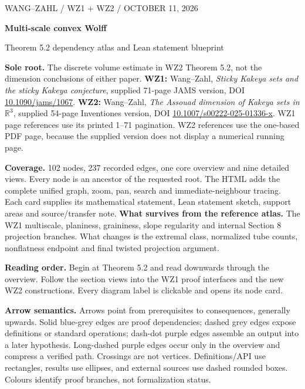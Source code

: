 \documentclass[10pt,a4paper]{article}
\begin{document}
\thispagestyle{empty}
{\sffamily\small\color{muted}WANG--ZAHL / WZ1 + WZ2 / OCTOBER 11, 2026}\par\vspace{5mm}
{\sffamily\Huge\bfseries\color{navy}Multi-scale convex Wolff}\par
{\sffamily\Large\color{navy}Theorem 5.2 dependency atlas and Lean statement blueprint}\par\vspace{5mm}
\begin{tcolorbox}[colback=panel,colframe=navy,boxrule=0.4pt,arc=2mm]
\textbf{Sole root.} The discrete volume estimate in WZ2 Theorem 5.2, not the dimension conclusions of either paper.
\textbf{WZ1:} Wang--Zahl, \emph{Sticky Kakeya sets and the sticky Kakeya conjecture}, supplied 71-page JAMS version, DOI \href{https://doi.org/10.1090/jams/1067}{10.1090/jams/1067}.
\textbf{WZ2:} Wang--Zahl, \emph{The Assouad dimension of Kakeya sets in $\mathbb R^3$}, supplied 54-page Inventiones version, DOI \href{https://doi.org/10.1007/s00222-025-01336-x}{10.1007/s00222-025-01336-x}.
WZ1 page references use its printed 1--71 pagination. WZ2 references use the one-based PDF page, because the supplied version does not display a numerical running page.
\end{tcolorbox}
\textbf{Coverage.} 102 nodes, 237 recorded edges, one core overview and nine detailed views. Every node is an ancestor of the requested root. The HTML adds the complete unified graph, zoom, pan, search and immediate-neighbour tracing. Each card supplies its mathematical statement, Lean statement sketch, support areas and source/transfer note.
\textbf{What survives from the reference atlas.} The WZ1 multiscale, planiness, graininess, slope regularity and internal Section 8 projection branches. What changes is the extremal class, normalized tube counts, nonflatness endpoint and final twisted projection argument.

\textbf{Reading order.} Begin at Theorem 5.2 and read downwards through the overview. Follow the section views into the WZ1 proof interfaces and the new WZ2 constructions. Every diagram label is clickable and opens its node card.

\textbf{Arrow semantics.} Arrows point from prerequisites to consequences, generally upwards. Solid blue-grey edges are proof dependencies; dashed grey edges expose definitions or standard operations; dash-dot purple edges assemble an output into a later hypothesis. Long-dashed purple edges occur only in the overview and compress a verified path. Crossings are not vertices. Definitions/API use rectangles, results use ellipses, and external sources use dashed rounded boxes. Colours identify proof branches, not formalization status.
\end{document}
